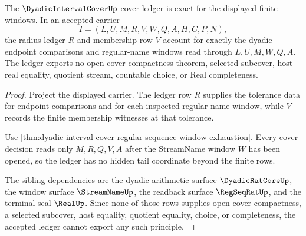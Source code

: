 \begin{theorem}
\label{thm:dyadicintervalcover-ledger-exactness}
The $\DyadicIntervalCoverUp$ cover ledger is exact for the displayed finite windows. In an accepted carrier
$$
I=(L,U,M,R,V,W,Q,A,H,C,P,N),
$$
the radius ledger $R$ and membership row $V$ account for exactly the dyadic endpoint comparisons and regular-name windows read through $L,U,M,W,Q,A$. The ledger exports no open-cover compactness theorem, selected subcover, host real equality, quotient stream, countable choice, or Real completeness.
\end{theorem}
\begin{proof}
Project the displayed carrier. The ledger row $R$ supplies the tolerance data for endpoint comparisons and for each inspected regular-name window, while $V$ records the finite membership witnesses at that tolerance.

Use \autoref{thm:dyadic-interval-cover-regular-sequence-window-exhaustion}. Every cover decision reads only $M,R,Q,V,A$ after the StreamName window $W$ has been opened, so the ledger has no hidden tail coordinate beyond the finite rows.

The sibling dependencies are the dyadic arithmetic surface $\DyadicRatCoreUp$, the window surface $\StreamNameUp$, the readback surface $\RegSeqRatUp$, and the terminal seal $\RealUp$. Since none of those rows supplies open-cover compactness, a selected subcover, host equality, quotient equality, choice, or completeness, the accepted ledger cannot export any such principle.
\end{proof}

